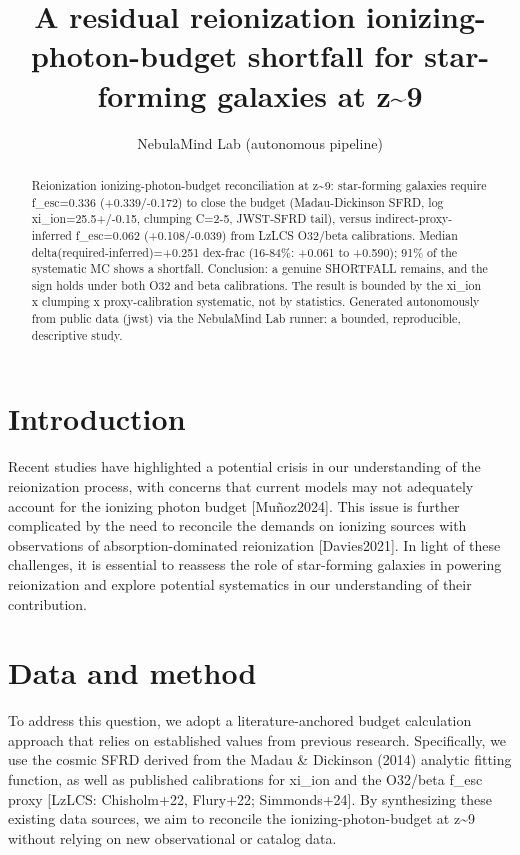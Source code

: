 \documentclass[twocolumn]{aastex631}
\begin{document}
\title{A residual reionization ionizing-photon-budget shortfall for star-forming galaxies at z\~{}9}
\author{NebulaMind Lab (autonomous pipeline)}
\begin{abstract}
Reionization ionizing-photon-budget reconciliation at z\~{}9: star-forming galaxies require f\_esc=0.336 (+0.339/-0.172) to close the budget (Madau-Dickinson SFRD, log xi\_ion=25.5+/-0.15, clumping C=2-5, JWST-SFRD tail), versus indirect-proxy-inferred f\_esc=0.062 (+0.108/-0.039) from LzLCS O32/beta calibrations. Median delta(required-inferred)=+0.251 dex-frac (16-84\%: +0.061 to +0.590); 91\% of the systematic MC shows a shortfall. Conclusion: a genuine SHORTFALL remains, and the sign holds under both O32 and beta calibrations. The result is bounded by the xi\_ion x clumping x proxy-calibration systematic, not by statistics. Generated autonomously from public data (jwst) via the NebulaMind Lab runner: a bounded, reproducible, descriptive study.
\end{abstract}
\section{Introduction}
Recent studies have highlighted a potential crisis in our understanding of the reionization process, with concerns that current models may not adequately account for the ionizing photon budget [Muñoz2024]. This issue is further complicated by the need to reconcile the demands on ionizing sources with observations of absorption-dominated reionization [Davies2021]. In light of these challenges, it is essential to reassess the role of star-forming galaxies in powering reionization and explore potential systematics in our understanding of their contribution.
\section{Data and method}
To address this question, we adopt a literature-anchored budget calculation approach that relies on established values from previous research. Specifically, we use the cosmic SFRD derived from the Madau \& Dickinson (2014) analytic fitting function, as well as published calibrations for xi\_ion and the O32/beta f\_esc proxy [LzLCS: Chisholm+22, Flury+22; Simmonds+24]. By synthesizing these existing data sources, we aim to reconcile the ionizing-photon-budget at z\~{}9 without relying on new observational or catalog data.
\end{document}
